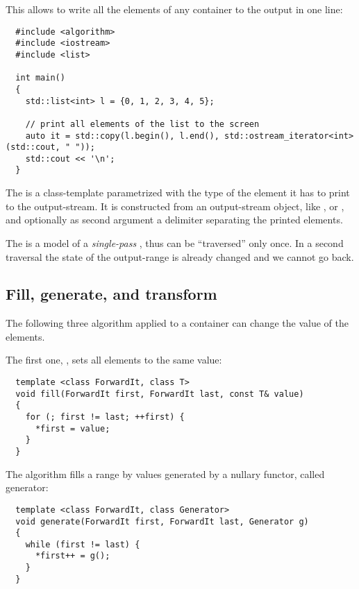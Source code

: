 This allows to write all the elements of any container to the output in one line:
\begin{verbatim}
  #include <algorithm>
  #include <iostream>
  #include <list>

  int main()
  {
    std::list<int> l = {0, 1, 2, 3, 4, 5};

    // print all elements of the list to the screen
    auto it = std::copy(l.begin(), l.end(), std::ostream_iterator<int>(std::cout, " "));
    std::cout << '\n';
  }
\end{verbatim}
%
The  is a class-template parametrized with the type of the element it has to print to the output-stream. It is
constructed from an output-stream object, like ,  or , and optionally as second argument
a delimiter separating the printed elements.

The  is a model of a \emph{single-pass} , thus can be ``traversed'' only once. In a second traversal
the state of the output-range is already changed and we cannot go back.


\subsection{Fill, generate, and transform}
The following three algorithm applied to a container can change the value of the elements.

The first one, , sets all elements to the same value:
%
\begin{samepage}
\begin{verbatim}
  template <class ForwardIt, class T>
  void fill(ForwardIt first, ForwardIt last, const T& value)
  {
    for (; first != last; ++first) {
      *first = value;
    }
  }
\end{verbatim}
\end{samepage}

The algorithm  fills a range by values generated by a nullary functor, called generator:
%
\begin{samepage}
\begin{verbatim}
  template <class ForwardIt, class Generator>
  void generate(ForwardIt first, ForwardIt last, Generator g)
  {
    while (first != last) {
      *first++ = g();
    }
  }
\end{verbatim}
\end{samepage}

